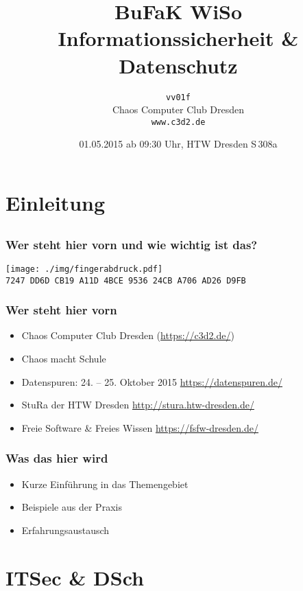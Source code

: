 \documentclass[12pt]{beamer}
\title{BuFaK WiSo\\Informationssicherheit \& Datenschutz}
\author{\small \texttt{vv01f} \\ \Large Chaos Computer Club Dresden \\ \texttt{www.c3d2.de}  }
\date{01.05.2015 ab 09:30 Uhr, HTW Dresden S\,308a }
\begin{document}
\maketitle

\section{Einleitung}
\subsection{}

\begin{frame}
	\frametitle{Wer steht hier vorn und wie wichtig ist das?}
		\begin{center}
			\texttt{[image: ./img/fingerabdruck.pdf]} \\
			\texttt{7247 DD6D CB19 A11D 4BCE  9536 24CB A706 AD26 D9FB}
		\end{center}
\end{frame}

\begin{frame}
	\frametitle{Wer steht hier vorn}
	\begin{itemize}
		\item Chaos Computer Club Dresden (\url{https://c3d2.de/})
		\item Chaos macht Schule
		\item Datenspuren: 24. -- 25. Oktober 2015 \url{https://datenspuren.de/}
		\item StuRa der HTW Dresden \url{http://stura.htw-dresden.de/}
		\item Freie Software \& Freies Wissen \url{https://fsfw-dresden.de/}
	\end{itemize}
\end{frame}

\begin{frame}
	\frametitle{Was das hier wird}
	\begin{itemize}
		\item Kurze Einführung in das Themengebiet
		\item Beispiele aus der Praxis
		\item Erfahrungsaustausch
	\end{itemize}
\end{frame}

\section{ITSec \& DSch}
\end{document}

